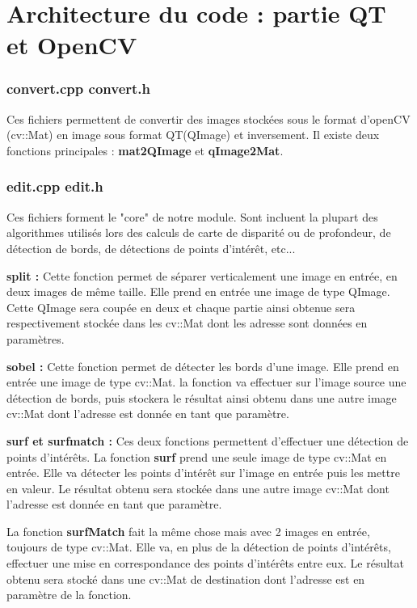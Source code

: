 \documentclass[a4paper]{article}
\begin{document}
\section{Architecture du code : partie QT et OpenCV}

\subsubsection*{convert.cpp convert.h}

Ces fichiers permettent de convertir des images stockées sous le format d'openCV
(cv::Mat) en image sous format QT(QImage) et inversement. Il existe deux fonctions
principales : \textbf{mat2QImage} et \textbf{qImage2Mat}.

\subsubsection*{edit.cpp edit.h}

Ces fichiers forment le "core" de notre module. Sont incluent la plupart des
algorithmes utilisés lors des calculs de carte de disparité ou de profondeur,
de détection de bords, de détections de points d'intérêt, etc...


\textbf{split :} Cette fonction permet de séparer verticalement une image en
entrée, en deux images de même taille. Elle prend en entrée une image de type
QImage. Cette QImage sera coupée en deux et chaque partie ainsi obtenue sera
respectivement stockée dans les cv::Mat dont les adresse sont données en paramètres.


\textbf{sobel :} Cette fonction permet de détecter les bords d'une image. Elle
prend en entrée une image de type cv::Mat. la fonction va effectuer sur l'image
source une détection de bords, puis stockera le résultat ainsi obtenu dans une
autre image cv::Mat dont l'adresse est donnée en tant que paramètre.


\textbf{surf et surfmatch :} Ces deux fonctions permettent d'effectuer une détection
de points d'intérêts. La fonction \textbf{surf} prend une seule image de type
cv::Mat en entrée. Elle va détecter les points d'intérêt sur l'image en entrée puis
les mettre en valeur. Le résultat obtenu sera stockée dans une autre image cv::Mat
dont l'adresse est donnée en tant que paramètre.


La fonction \textbf{surfMatch} fait la même chose mais avec 2 images en entrée,
toujours de type cv::Mat. Elle va, en plus de la détection de points d'intérêts,
effectuer une mise en correspondance des points d'intérêts entre eux. Le résultat
obtenu sera stocké dans une cv::Mat de destination dont l'adresse est en paramètre
de la fonction.
\end{document}
